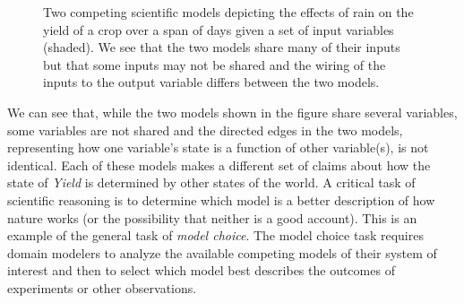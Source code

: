 \begin{figure}[!htbp]
  \centering
  \caption[Competing Models of Crop Yield]{Two competing scientific models depicting the effects of rain on the yield of a crop over a span of days given a set of input variables (shaded). We see that the two models share many of their inputs but that some inputs may not be shared and the wiring of the inputs to the output variable differs between the two models.}
  \label{fig:simple_crop_CAG}
\end{figure}

We can see that, while the two models shown in the figure share several variables, some variables are not shared and the directed edges in the two models, representing how one variable’s state is a function of other variable(s), is not identical.
Each of these models makes a different set of claims about how the state of \emph{Yield} is determined by other states of the world.
A critical task of scientific reasoning is to determine which model is a better description of how nature works (or the possibility that neither is a good account).
This is an example of the general task of \textit{model choice}.
The model choice task requires domain modelers to analyze the available competing models of their system of interest and then to select which model best describes the outcomes of experiments or other observations.

